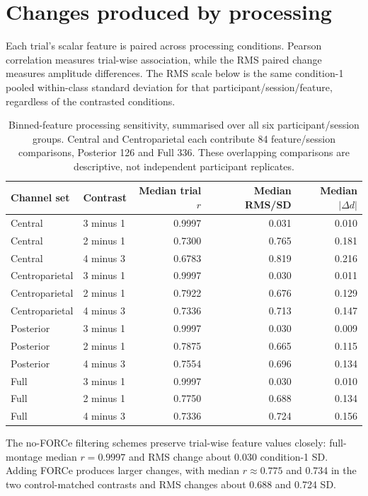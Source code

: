 \documentclass[11pt,a4paper]{article}
\begin{document}
\section{Changes produced by processing}
Each trial's scalar feature is paired across processing conditions. Pearson correlation measures trial-wise association, while the RMS paired change measures amplitude differences. The RMS scale below is the same condition-1 pooled within-class standard deviation for that participant/session/feature, regardless of the contrasted conditions.
\begin{table}[H]\centering\small
\begin{tabular}{@{}llrrr@{}}\toprule
Channel set & Contrast & Median trial $r$ & Median RMS/SD & Median $|\Delta d|$\\\midrule
Central & 3 minus 1 & 0.9997 & 0.031 & 0.010 \\
Central & 2 minus 1 & 0.7300 & 0.765 & 0.181 \\
Central & 4 minus 3 & 0.6783 & 0.819 & 0.216 \\
Centroparietal & 3 minus 1 & 0.9997 & 0.030 & 0.011 \\
Centroparietal & 2 minus 1 & 0.7922 & 0.676 & 0.129 \\
Centroparietal & 4 minus 3 & 0.7336 & 0.713 & 0.147 \\
Posterior & 3 minus 1 & 0.9997 & 0.030 & 0.009 \\
Posterior & 2 minus 1 & 0.7875 & 0.665 & 0.115 \\
Posterior & 4 minus 3 & 0.7554 & 0.696 & 0.134 \\
Full & 3 minus 1 & 0.9997 & 0.030 & 0.010 \\
Full & 2 minus 1 & 0.7750 & 0.688 & 0.134 \\
Full & 4 minus 3 & 0.7336 & 0.724 & 0.156 \\
\bottomrule\end{tabular}
\caption{Binned-feature processing sensitivity, summarised over all six participant/session groups. Central and Centroparietal each contribute 84 feature/session comparisons, Posterior 126 and Full 336. These overlapping comparisons are descriptive, not independent participant replicates.}\label{tab:processing}
\end{table}
The no-FORCe filtering schemes preserve trial-wise feature values closely: full-montage median $r=0.9997$ and RMS change about 0.030 condition-1 SD. Adding FORCe produces larger changes, with median $r\approx0.775$ and 0.734 in the two control-matched contrasts and RMS changes about 0.688 and 0.724 SD.
\end{document}
